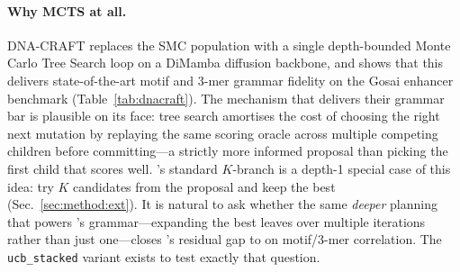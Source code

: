 \paragraph{Why MCTS at all.}
DNA-CRAFT replaces the SMC population with a single depth-bounded Monte Carlo Tree Search loop on a DiMamba diffusion backbone, and shows that this delivers state-of-the-art motif and 3-mer grammar fidelity on the Gosai enhancer benchmark (Table~\ref{tab:dnacraft}). The mechanism that delivers their grammar bar is plausible on its face: tree search amortises the cost of choosing the right next mutation by replaying the same scoring oracle across multiple competing children before committing—a strictly more informed proposal than picking the first child that scores well. \gpa{}'s standard $K$-branch is a depth-1 special case of this idea: try $K$ candidates from the proposal and keep the best (Sec.~\ref{sec:method:ext}). It is natural to ask whether the same \emph{deeper} planning that powers \dnacraft{}'s grammar—expanding the best leaves over multiple iterations rather than just one---closes \gpa{}'s residual gap to \dnacraft{} on motif/3-mer correlation. The \texttt{ucb\_stacked} variant exists to test exactly that question.


